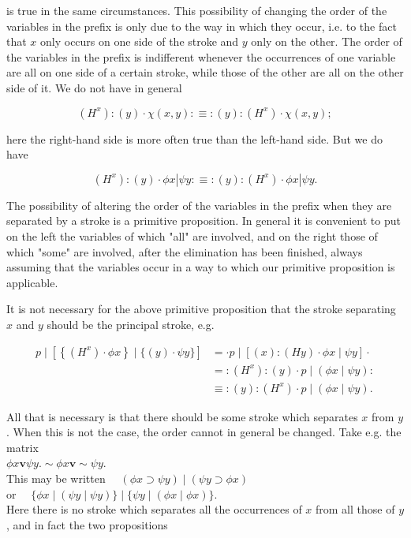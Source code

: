 \documentclass[10pt]{article}
\begin{document}
is true in the same circumstances. This possibility of changing the order of the variables in the prefix is only due to the way in which they occur, i.e. to the fact that $x$ only occurs on one side of the stroke and $y$ only on the other. The order of the variables in the prefix is indifferent whenever the occurrences of one variable are all on one side of a certain stroke, while those of the other are all on the other side of it. We do not have in general

$$
\left(H^{x}\right):(y) \cdot \chi(x, y): \equiv:(y):\left(H^{x}\right) \cdot \chi(x, y) ;
$$

here the right-hand side is more often true than the left-hand side. But we do have

$$
\left(H^{x}\right):(y) \cdot \phi x\left|\psi y: \equiv:(y):\left(H^{x}\right) \cdot \phi x\right| \psi y .
$$

The possibility of altering the order of the variables in the prefix when they are separated by a stroke is a primitive proposition. In general it is convenient to put on the left the variables of which "all" are involved, and on the right those of which "some" are involved, after the elimination has been finished, always assuming that the variables occur in a way to which our primitive proposition is applicable.

It is not necessary for the above primitive proposition that the stroke separating $x$ and $y$ should be the principal stroke, e.g.

$$
\begin{aligned}
p \mid\left[\left\{\left(H^{x}\right) \cdot \phi x\right\} \mid\{(y) \cdot \psi y\}\right] & =\cdot p \mid[(x):(H y) \cdot \phi x \mid \psi y] \cdot \\
& =:\left(H^{x}\right):(y) \cdot p \mid(\phi x \mid \psi y): \\
& \equiv:(y):\left(H^{x}\right) \cdot p \mid(\phi x \mid \psi y) .
\end{aligned}
$$

All that is necessary is that there should be some stroke which separates $x$ from $y$. When this is not the case, the order cannot in general be changed. Take e.g. the matrix\\
$\phi x \mathbf{v} \psi y . \sim \phi x \mathbf{v} \sim \psi y$.\\
This may be written $\quad(\phi x \supset \psi y) \mid(\psi y \supset \phi x)$\\
or $\quad\{\phi x \mid(\psi y \mid \psi y)\} \mid\{\psi y \mid(\phi x \mid \phi x)\}$.\\
Here there is no stroke which separates all the occurrences of $x$ from all those of $y$, and in fact the two propositions
\end{document}
